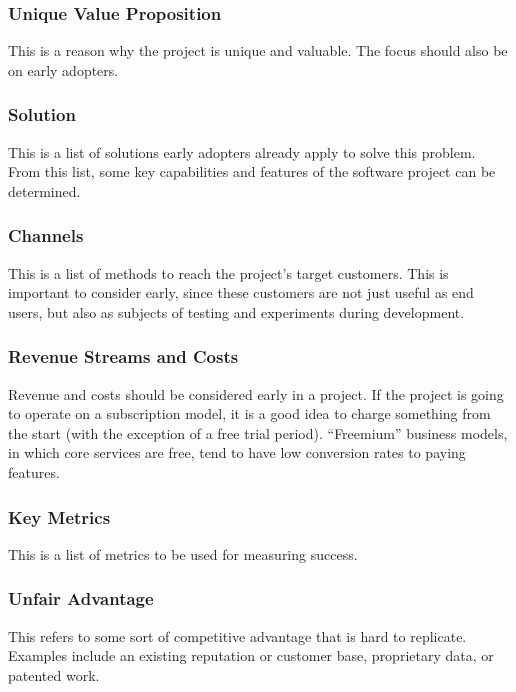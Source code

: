 \documentclass[12pt,titlepage]{article}
\begin{document}
      \subsubsection{Unique Value Proposition}
        This is a reason why the project is unique and valuable. The focus should also be on early adopters.

      \subsubsection{Solution}
        This is a list of solutions early adopters already apply to solve this problem. From this list, some key capabilities and features
        of the software project can be determined.

      \subsubsection{Channels}
        This is a list of methods to reach the project's target customers. This is important to consider early, since these customers
        are not just useful as end users, but also as subjects of testing and experiments during development.

      \subsubsection{Revenue Streams and Costs}
        Revenue and costs should be considered early in a project. If the project is going to operate on a subscription model, it is
        a good idea to charge something from the start (with the exception of a free trial period). ``Freemium'' business models, in
        which core services are free, tend to have low conversion rates to paying features.

      \subsubsection{Key Metrics}
        This is a list of metrics to be used for measuring success.

      \subsubsection{Unfair Advantage}
        This refers to some sort of competitive advantage that is hard to replicate. Examples include an existing reputation or customer
        base, proprietary data, or patented work.

  \newpage
\end{document}
